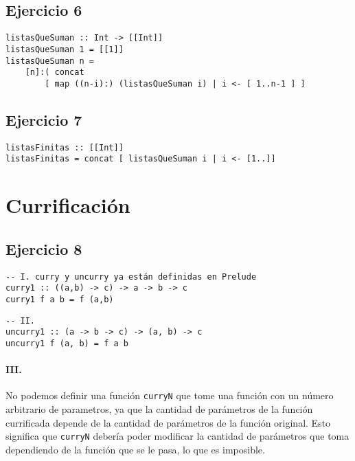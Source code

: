 \documentclass[10pt,a4paper]{article}
\begin{document}
\subsection{Ejercicio 6}
\begin{centrado}
\begin{verbatim}
listasQueSuman :: Int -> [[Int]]
listasQueSuman 1 = [[1]]
listasQueSuman n = 
    [n]:( concat 
	    [ map ((n-i):) (listasQueSuman i) | i <- [ 1..n-1 ] ] 
\end{verbatim}
\end{centrado}

\subsection{Ejercicio 7}

\begin{centrado}
	\begin{verbatim}
listasFinitas :: [[Int]]
listasFinitas = concat [ listasQueSuman i | i <- [1..]]
\end{verbatim}
\end{centrado}	

\section*{Currificación}
\subsection{Ejercicio 8}

\begin{centrado}
	\begin{verbatim}
-- I. curry y uncurry ya están definidas en Prelude
curry1 :: ((a,b) -> c) -> a -> b -> c
curry1 f a b = f (a,b)
	\end{verbatim}
\end{centrado}

\begin{centrado}
\begin{verbatim}
-- II.
uncurry1 :: (a -> b -> c) -> (a, b) -> c
uncurry1 f (a, b) = f a b
	\end{verbatim}
\end{centrado}

\paragraph{III.} No podemos definir una función \texttt{curryN} que tome una función con un número arbitrario de parametros, ya que la cantidad de parámetros de la función currificada depende de la cantidad de parámetros de la función original. Esto significa que \texttt{curryN} debería poder modificar la cantidad de parámetros que toma dependiendo de la función que se le pasa, lo que es imposible.
\end{document}
